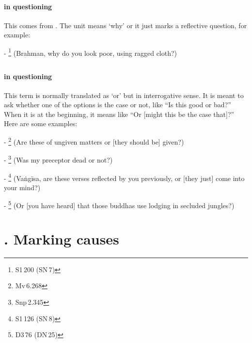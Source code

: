 \subsection*{}\label{nip:kinnu}
\paragraph*{ in questioning} This comes from . The unit means `why' or it just marks a reflective question, for example:\par
- \footnote{S1\,200 (SN\,7)} (Brahman, why do you look poor, using ragged cloth?) \par

\subsection*{}\label{nip:udaahu}
\paragraph*{ in questioning} This term is normally translated as `or' but in interrogative sense. It is meant to ask whether one of the options is the case or not, like ``Is this good or bad?'' When it is at the beginning, it means like ``Or [might this be the case that]?'' Here are some examples:\par
- \footnote{Mv\,6.268} (Are these of ungiven matters or [they should be] given?) \par
- \footnote{Snp\,2.345} (Was my preceptor dead or not?)\par
- \footnote{S1\,126 (SN\,8)} (Va\.ng\=isa, are these verses reflected by you previously, or [they just] come into your mind?)\par
- \footnote{D3\,76 (DN\,25)} (Or [you have heard] that those buddhas use lodging in secluded jungles?)\par

\label{nipgrp5}
\section*{. Marking causes}

